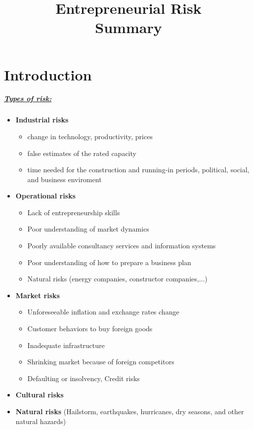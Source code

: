\documentclass[8pt]{extreport}
\title{Entrepreneurial Risk\\ Summary}
\begin{document}
	\maketitle
	\newpage
\chapter{Introduction}
\paragraph{\underline{Types of risk:}}{
\begin{itemize}
\item \textbf{Industrial risks}
\begin{itemize}
\item change in technology, productivity, prices
\item false estimates of the rated capacity
\item time needed for the construction and running-in periods, political, social, and business enviroment
\end{itemize}
\item \textbf{Operational risks}
\begin{itemize}
\item Lack of entrepreneurship skills
\item Poor understanding of market dynamics
\item Poorly available consultancy services and information systems
\item Poor understanding of how to prepare a business plan
\item Natural risks (energy companies, constructor companies,...)
\end{itemize}
\item \textbf{Market risks}
\begin{itemize}
\item Unforeseeable inflation and exchange rates change
\item Customer behaviors to buy foreign goods
\item Inadequate infrastructure
\item Shrinking market because of foreign competitors
\item Defaulting or insolvency, Credit risks
\end{itemize}
\item \textbf{Cultural risks}

\item \textbf{Natural risks} (Hailstorm, earthquakes, hurricanes, dry seasons, and other natural hazards)


\end{itemize}}
\end{document}

